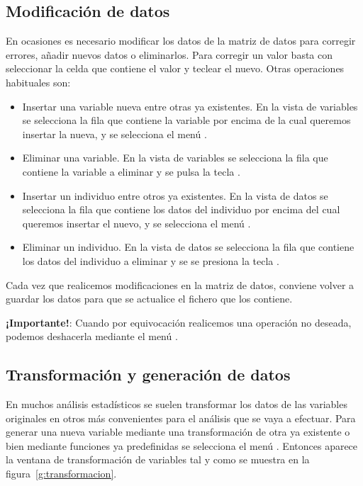 \subsection{Modificación de datos}
En ocasiones es necesario modificar los datos de la matriz de datos para corregir errores, añadir nuevos datos o eliminarlos. Para corregir un valor basta con seleccionar la celda que contiene el valor y teclear el nuevo. Otras operaciones habituales son:
\begin{itemize}
\item Insertar una variable nueva entre otras ya existentes. En la vista de variables se selecciona la fila que contiene la variable por encima de la cual queremos insertar la nueva, y se selecciona el menú . 

\item Eliminar una variable. En la vista de variables se selecciona la fila que contiene la variable a eliminar y se pulsa la tecla .

\item Insertar un individuo entre otros ya existentes. En la vista de datos se selecciona la fila que contiene los datos del individuo por encima del cual queremos insertar el nuevo, y se selecciona el menú . 

\item Eliminar un individuo.  En la vista de datos se selecciona la fila que contiene los datos del individuo a eliminar y se se presiona la tecla . 
\end{itemize}

Cada vez que realicemos modificaciones en la matriz de datos, conviene volver a guardar los datos para que se actualice el fichero que los contiene.

\textbf{¡Importante!}: Cuando por equivocación realicemos una operación no deseada, podemos deshacerla mediante el menú .

\subsection{Transformación y generación de datos}
En muchos análisis estadísticos se suelen transformar los datos de las variables originales en otros más convenientes para el análisis que se vaya a efectuar. Para generar una nueva variable mediante una transformación de otra ya existente o bien mediante funciones ya predefinidas se selecciona el menú . Entonces aparece la ventana de transformación de variables tal y como se muestra en la figura~\ref{g:transformacion}.

